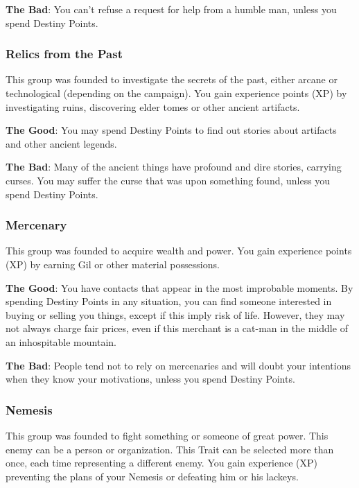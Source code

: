 \begin{multicols}{2}
\textbf{The Bad}: You can’t refuse a request for help from a humble man, unless you spend Destiny Points.

\begin{ffcolpage}
\subsubsection{Relics from the Past}
This group was founded to investigate the secrets of the past, either arcane or technological (depending on the campaign). You gain experience points (XP) by investigating ruins, discovering elder tomes or other ancient artifacts.

\textbf{The Good}: You may spend Destiny Points to find out stories about artifacts and other ancient legends.

\textbf{The Bad}: Many of the ancient things have profound and dire stories, carrying curses. You may suffer the curse that was upon something found, unless you spend Destiny Points. \pc

\begin{center}
\end{center}
\end{ffcolpage}

\subsubsection{Mercenary}
This group was founded to acquire wealth and power. You gain experience points (XP) by earning Gil or other material possessions.

\textbf{The Good}: You have contacts that appear in the most improbable moments. By spending Destiny Points in any situation, you can find someone interested in buying or selling you things, except if this imply risk of life. However, they may not always charge fair prices, even if this merchant is a cat-man in the middle of an inhospitable mountain.

\textbf{The Bad}: People tend not to rely on mercenaries and will doubt your intentions when they know your motivations, unless you spend Destiny Points.

\subsubsection{Nemesis}
This group was founded to fight something or someone of great power. This enemy can be a person or organization. This Trait can be selected more than once, each time representing a different enemy. You gain experience (XP) preventing the plans of your Nemesis or defeating him or his lackeys.


\end{multicols}
